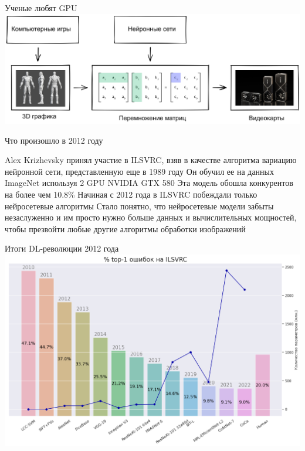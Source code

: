 \documentclass[aspectratio=169, professionalfonts]{beamer}
\begin{document}
\begin{frame}{Ученые любят GPU}
    \centering
    \includegraphics[width=\linewidth]{figures/fig59-matrices.jpg}
\end{frame}

\begin{frame}{Что произошло в 2012 году}
    \begin{outline}
        \1 Alex Krizhevsky принял участие в ILSVRC, взяв в качестве алгоритма вариацию
        нейронной сети, представленную еще в 1989 году
        \1 Он обучил ее на данных ImageNet используя 2 GPU NVIDIA GTX 580
        \1 Эта модель обошла конкурентов на более чем 10.8\%
        \1 Начиная с 2012 года в ILSVRC побеждали только нейросетевые алгоритмы
        \1 Стало понятно, что нейросетевые модели забыты незаслуженно и им просто нужно
        больше данных и вычислительных мощностей, чтобы презвойти любые другие алгоритмы
        обработки изображений
    \end{outline}
\end{frame}

\begin{frame}{Итоги DL-революции 2012 года}
    \centering
    \includegraphics[width=.75\linewidth]{figures/fig60-ilsvrc-results.jpg}
\end{frame}
\end{document}
